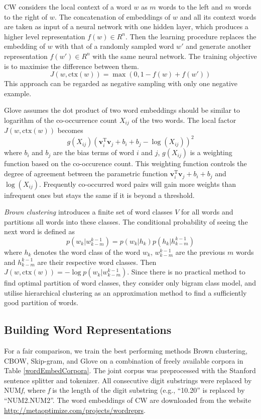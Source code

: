 CW considers the local context of a word $w$ as $m$ words to the left and $m$ words to the right of $w$. The concatenation of embeddings of $w$ and all its context words are taken as input of a neural network with one hidden layer, which produces a higher level representation $f(w) \in R^n$. Then the learning procedure replaces the embedding of $w$ with that of a randomly sampled word $w'$ and generate another representation $f(w') \in R^n$ with the same neural network. The training objective is to maximise the difference between them.
\begin{displaymath}
J(w, \text{ctx}(w)) = \max (0, 1 - f(w) + f(w'))
\end{displaymath}
This approach can be regarded as negative sampling with only one negative example.

Glove assumes the dot product of two word embeddings should be similar to logarithm of the co-occurrence count $X_{ij}$ of the two words. The local factor $J(w, \text{ctx}(w))$ becomes
\begin{displaymath}
g(X_{ij}) (\mathbf{v}_i^{\text{T}} \mathbf{v}_j + b_i + b_j - \log(X_{ij}))^2
\end{displaymath}
where $b_i$ and $b_j$ are the bias terms of word $i$ and $j$, $g(X_{ij})$ is a weighting function based on the co-occurence count. This weighting function controls the degree of agreement between the parametric function $\mathbf{v}_i^{\text{T}} \mathbf{v}_j + b_i + b_j $ and $\log(X_{ij})$. Frequently co-occurred word pairs will gain more weights than infrequent ones but stays the same if it is beyond a threshold.

\textit{Brown clustering} introduces a finite set of word classes $V$ for all words and partitions all words into these classes. The conditional probability of seeing the next word is defined as
\begin{displaymath}
p(w_k | w_{k - m}^{k -1}) = p(w_k | h_k) p(h_k | h_{k - m}^{k -1})
\end{displaymath}
where $h_k$ denotes the word class of the word $w_k$, $w_{k - m}^{k -1}$ are the previous $m$ words and $h_{k - m}^{k -1}$ are their respective word classes. Then $J(w, \text{ctx}(w)) = - \log p(w_k | w_{k - m}^{k -1}) $. Since there is no practical method to find optimal partition of word classes, they consider only bigram class model, and utilise hierarchical clustering as an approximation method to find a sufficiently good partition of words. 

\subsection{Building Word Representations}
\label{buildingWordRep}
For a fair comparison, we train the best performing methods Brown clustering, CBOW, Skip-gram, and Glove on a combination of freely available corpora in Table \ref{wordEmbedCorpora}. The joint corpus was preprocessed with the Stanford sentence splitter and tokenizer. All consecutive digit substrings were replaced by NUM\textit{f}, where \textit{f} is the length of the digit substring (e.g., ``10.20'' is replaced by ``NUM2.NUM2''. The word embeddings of CW are downloaded from the website \url{http://metaoptimize.com/projects/wordreprs}.

